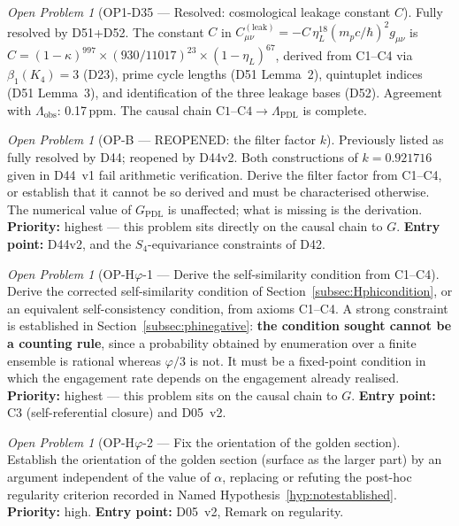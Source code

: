 \documentclass[11pt,a4paper]{article}
\theoremstyle{plain}
\theoremstyle{definition}
\theoremstyle{remark}
\newtheorem{openproblem}[theorem]{Open Problem}
\begin{document}
\begin{openproblem}[OP1-D35 --- Resolved: cosmological leakage constant $C$]
\label{op:leakconstant}
\textcolor{proofblue}{Fully resolved by D51+D52.} The constant $C$ in $C^{(\mathrm{leak})}_{\mu\nu}=-C\,\eta_L^{18}(m_p c/\hbar)^2 g_{\mu\nu}$ is $C=(1-\kappa)^{997}\times(930/11017)^{23}\times(1-\eta_L)^{67}$, derived from C1--C4 via $\beta_1(K_4)=3$ (D23), prime cycle lengths (D51 Lemma~2), quintuplet indices (D51 Lemma~3), and identification of the three leakage bases (D52). Agreement with $\Lambda_{\mathrm{obs}}$: 0.17\,ppm. The causal chain $\mathrm{C1\text{--}C4}\to\Lambda_{\mathrm{PDL}}$ is complete.
\end{openproblem}

\begin{openproblem}[OP-B --- REOPENED: the filter factor $k$]
\label{op:OPB}
\textcolor{negativered}{Previously listed as fully resolved by D44; reopened by D44v2.} Both constructions of $k=0.921716$ given in D44~v1 fail arithmetic verification. Derive the filter factor from C1--C4, or establish that it cannot be so derived and must be characterised otherwise. The numerical value of $G_{\mathrm{PDL}}$ is unaffected; what is missing is the derivation. \textbf{Priority:} highest --- this problem sits directly on the causal chain to $G$. \textbf{Entry point:} D44v2, and the $S_4$-equivariance constraints of D42.
\end{openproblem}

\begin{openproblem}[OP-H$\varphi$-1 --- Derive the self-similarity condition from C1--C4]
\label{op:Hphi1}
Derive the corrected self-similarity condition of Section~\ref{subsec:Hphicondition}, or an equivalent self-consistency condition, from axioms C1--C4. A strong constraint is established in Section~\ref{subsec:phinegative}: \textbf{the condition sought cannot be a counting rule}, since a probability obtained by enumeration over a finite ensemble is rational whereas $\varphi/3$ is not. It must be a fixed-point condition in which the engagement rate depends on the engagement already realised. \textbf{Priority:} highest --- this problem sits on the causal chain to $G$. \textbf{Entry point:} C3 (self-referential closure) and D05~v2.
\end{openproblem}

\begin{openproblem}[OP-H$\varphi$-2 --- Fix the orientation of the golden section]
\label{op:Hphi2}
Establish the orientation of the golden section (surface as the larger part) by an argument independent of the value of $\alpha$, replacing or refuting the post-hoc regularity criterion recorded in Named Hypothesis~\ref{hyp:notestablished}. \textbf{Priority:} high. \textbf{Entry point:} D05~v2, Remark on regularity.
\end{openproblem}
\end{document}

